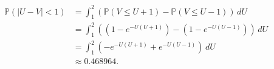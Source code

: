 \documentclass[12pt]{article}
\begin{document}
\medskip
{}
\begin{align*}
    \mathbb P(|U-V|<1) &= \int_1^2 \left(\mathbb P(V \leq U + 1) - \mathbb P(V \leq U - 1)\right)\,dU \\
                       &= \int_1^2\left((1 - e^{-U(U+1)}) - (1 - e^{-U(U-1)})\right)\,dU \\
                       &= \int_1^2\left(-e^{-U(U+1)} + e^{-U(U-1)}\right)\,dU \\
                       &\approx 0.468964.
\end{align*}
\end{document}
